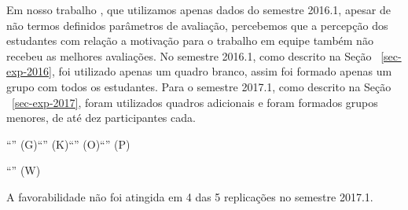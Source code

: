 
Em nosso trabalho \cite{gavaza2017}, que utilizamos apenas dados do
semestre 2016.1, apesar de não termos definidos parâmetros
de avaliação, percebemos que a percepção dos estudantes com relação
a motivação para o trabalho em equipe também não recebeu as melhores
avaliações.
No semestre 2016.1, como descrito na Seção ~\ref{sec-exp-2016}, foi utilizado
apenas um quadro branco, assim foi formado apenas um grupo com todos
os estudantes.
Para o semestre 2017.1, como descrito na Seção ~\ref{sec-exp-2017}, foram
utilizados quadros adicionais e foram formados grupos menores,
de até dez participantes cada.


\AprovacaoHipoteseResultado{}{}{}{}{}{}{}{}{}

{``\LikertPG'' (G)}{``\LikertPK'' (K)}{``\LikertPO'' (O)}{``\LikertPP'' (P)}


{``\LikertPW'' (W)}{}{}{}

A favorabilidade não foi atingida em 4 das 5 replicações no
semestre 2017.1.

